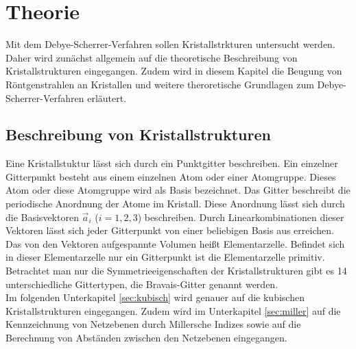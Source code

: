 \section{Theorie}
Mit dem Debye-Scherrer-Verfahren sollen Kristallstrkturen untersucht werden.
Daher wird zunächst allgemein auf die theoretische Beschreibung von Kristallstrukturen eingegangen.
Zudem wird in diesem Kapitel die Beugung von Röntgenstrahlen an Kristallen und weitere theroretische Grundlagen zum Debye-Scherrer-Verfahren erläutert.

\subsection{Beschreibung von Kristallstrukturen}
Eine Kristallstuktur lässt sich durch ein Punktgitter beschreiben.
Ein einzelner Gitterpunkt besteht aus einem einzelnen Atom oder einer Atomgruppe.
Dieses Atom oder diese Atomgruppe wird als Basis bezeichnet.
Das Gitter beschreibt die periodische Anordnung der Atome im Kristall.
Diese Anordnung lässt sich durch die Basisvektoren $\vec a_i$ ($i=1,2,3$) beschreiben.
Durch Linearkombinationen dieser Vektoren lässt sich jeder Gitterpunkt von einer beliebigen Basis aus erreichen.\\
Das von den Vektoren aufgespannte Volumen heißt Elementarzelle.
Befindet sich in dieser Elementarzelle nur ein Gitterpunkt ist die Elementarzelle primitiv.
Betrachtet man nur die Symmetrieeigenschaften der Kristallstrukturen gibt es 14 unterschiedliche Gittertypen, die Bravais-Gitter genannt werden.\\
Im folgenden Unterkapitel \ref{sec:kubisch} wird genauer auf die kubischen Kristallstrukturen eingegangen.
Zudem wird im Unterkapitel \ref{sec:miller} auf die Kennzeichnung von Netzebenen durch Millersche Indizes sowie auf die Berechnung von Abständen zwischen den Netzebenen eingegangen.

